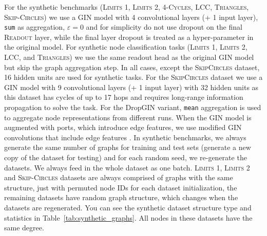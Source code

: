 \documentclass{article}
\begin{document}
For the synthetic benchmarks (\textsc{Limits 1}, \textsc{Limits 2}, \textsc{4-Cycles}, \textsc{LCC}, \textsc{Triangles}, \textsc{Skip-Circles}) we use a GIN model with 4 convolutional layers (+ 1 input layer), \texttt{sum} as aggregation, $\varepsilon=0$ and for simplicity do not use dropout on the final \textsc{Readout} layer, while the final layer dropout is treated as a hyper-parameter in the original model. For synthetic node classification tasks (\textsc{Limits 1}, \textsc{Limits 2}, \textsc{LCC}, and \textsc{Triangles}) we use the same readout head as the original GIN model but skip the graph aggregation step. In all cases, except the \textsc{SkipCircles} dataset, 16 hidden units are used for synthetic tasks. For the \textsc{SkipCircles} dataset we use a GIN model with 9 convolutional layers (+ 1 input layer) with 32 hidden units as this dataset has cycles of up to 17 hops and requires long-range information propagation to solve the task. For the DropGIN variant, \texttt{mean} aggregation is used to aggregate node representations from different runs. When the GIN model is augmented with ports, which introduce edge features, we use modified GIN convolutions that include edge features \citep{hu2019strategies}. In synthetic benchmarks, we always generate the same number of graphs for training and test sets (generate a new copy of the dataset for testing) and for each random seed, we re-generate the datasets. We always feed in the whole dataset as one batch. \textsc{Limits 1}, \textsc{Limits 2} and \textsc{Skip-Circles} datasets are always comprised of graphs with the same structure, just with permuted node IDs for each dataset initialization, the remaining datasets have random graph structure, which changes when the datasets are regenerated. You can see the synthetic dataset structure type and statistics in Table~\ref{tab:synthetic_graphs}. All nodes in these datasets have the same degree.
\end{document}
